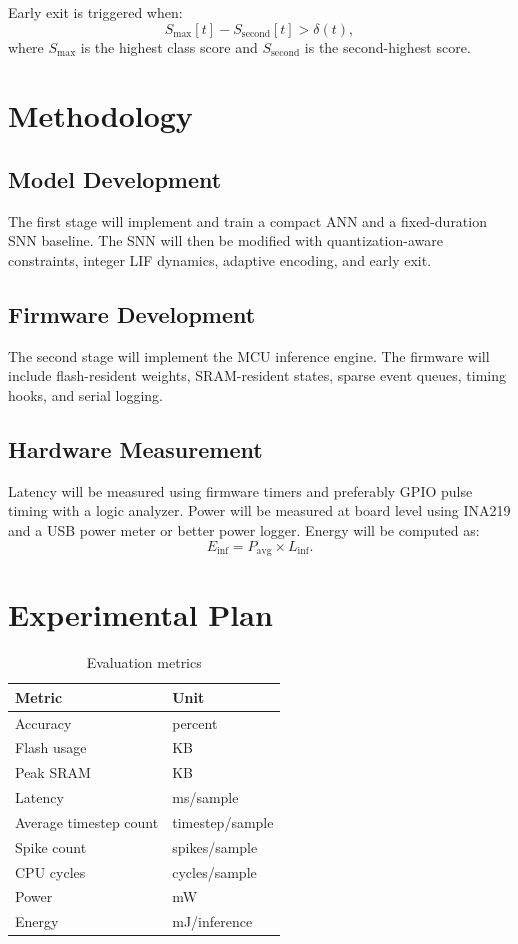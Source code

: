 \documentclass[12pt]{article}
\begin{document}
Early exit is triggered when:
\begin{equation}
    S_{\max}[t] - S_{\mathrm{second}}[t] > \delta(t),
\end{equation}
where $S_{\max}$ is the highest class score and $S_{\mathrm{second}}$ is the second-highest score.

\section{Methodology}
\subsection{Model Development}
The first stage will implement and train a compact ANN and a fixed-duration SNN baseline. The SNN will then be modified with quantization-aware constraints, integer LIF dynamics, adaptive encoding, and early exit.

\subsection{Firmware Development}
The second stage will implement the MCU inference engine. The firmware will include flash-resident weights, SRAM-resident states, sparse event queues, timing hooks, and serial logging.

\subsection{Hardware Measurement}
Latency will be measured using firmware timers and preferably GPIO pulse timing with a logic analyzer. Power will be measured at board level using INA219 and a USB power meter or better power logger. Energy will be computed as:
\begin{equation}
    E_{\mathrm{inf}} = P_{\mathrm{avg}} \times L_{\mathrm{inf}}.
\end{equation}

\section{Experimental Plan}
\begin{table}[h]
\centering
\caption{Evaluation metrics}
\begin{tabular}{ll}
\toprule
Metric & Unit \\
\midrule
Accuracy & percent \\
Flash usage & KB \\
Peak SRAM & KB \\
Latency & ms/sample \\
Average timestep count & timestep/sample \\
Spike count & spikes/sample \\
CPU cycles & cycles/sample \\
Power & mW \\
Energy & mJ/inference \\
\bottomrule
\end{tabular}
\end{table}
\end{document}
